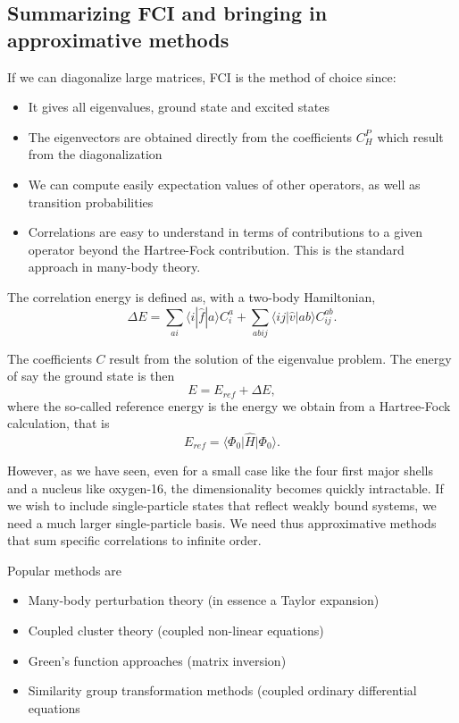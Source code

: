 \subsection{Summarizing FCI and bringing in approximative methods}


If we can diagonalize large matrices, FCI is the method of choice since:
\begin{itemize}
\item It gives all eigenvalues, ground state and excited states

\item The eigenvectors are obtained directly from the coefficients $C_H^P$ which result from the diagonalization

\item We can compute easily expectation values of other operators, as well as transition probabilities

\item Correlations are easy to understand in terms of contributions to a given operator beyond the Hartree-Fock contribution. This is the standard approach in  many-body theory. 
\end{itemize}

\noindent
The correlation energy is defined as, with a two-body Hamiltonian,  
\[
\Delta E=\sum_{ai}\langle i| \hat{f}|a \rangle C_{i}^{a}+
\sum_{abij}\langle ij | \hat{v}| ab \rangle C_{ij}^{ab}.
\]

The coefficients $C$ result from the solution of the eigenvalue problem. 
The energy of say the ground state is then
\[
E=E_{ref}+\Delta E,
\]
where the so-called reference energy is the energy we obtain from a Hartree-Fock calculation, that is
\[
E_{ref}=\langle \Phi_0 \vert \hat{H} \vert \Phi_0 \rangle.
\]

However, as we have seen, even for a small case like the four first major shells and a nucleus like oxygen-16, the dimensionality becomes quickly intractable. If we wish to include single-particle states that reflect weakly bound systems, we need a much larger single-particle basis. We need thus approximative methods that sum specific correlations to infinite order. 

Popular methods are
\begin{itemize}
\item Many-body perturbation theory (in essence a Taylor expansion)

\item Coupled cluster theory (coupled non-linear equations)

\item Green's function approaches (matrix inversion)

\item Similarity group transformation methods (coupled ordinary differential equations
\end{itemize}


